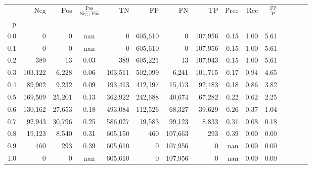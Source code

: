 \begin{tabular}{rrrcrrrrrrrrrrr}
\toprule
{} &      Neg &     Pos & $\frac{\text{Pos}}{\text{Neg}+\text{Pos}}$ &       TN &       FP &       FN &       TP &  Prec &   Rec & $\frac{\text{FP}}{\text{P}}$ \\
p   &          &         &                                            &          &          &          &          &       &       &                              \\
\midrule
0.0 &        0 &       0 &                                        nan &        0 &  605,610 &        0 &  107,956 &  0.15 &  1.00 &                         5.61 \\
0.1 &        0 &       0 &                                        nan &        0 &  605,610 &        0 &  107,956 &  0.15 &  1.00 &                         5.61 \\
0.2 &      389 &      13 &                                       0.03 &      389 &  605,221 &       13 &  107,943 &  0.15 &  1.00 &                         5.61 \\
0.3 &  103,122 &   6,228 &                                       0.06 &  103,511 &  502,099 &    6,241 &  101,715 &  0.17 &  0.94 &                         4.65 \\
0.4 &   89,902 &   9,232 &                                       0.09 &  193,413 &  412,197 &   15,473 &   92,483 &  0.18 &  0.86 &                         3.82 \\
0.5 &  169,509 &  25,201 &                                       0.13 &  362,922 &  242,688 &   40,674 &   67,282 &  0.22 &  0.62 &                         2.25 \\
0.6 &  130,162 &  27,653 &                                       0.18 &  493,084 &  112,526 &   68,327 &   39,629 &  0.26 &  0.37 &                         1.04 \\
0.7 &   92,943 &  30,796 &                                       0.25 &  586,027 &   19,583 &   99,123 &    8,833 &  0.31 &  0.08 &                         0.18 \\
0.8 &   19,123 &   8,540 &                                       0.31 &  605,150 &      460 &  107,663 &      293 &  0.39 &  0.00 &                         0.00 \\
0.9 &      460 &     293 &                                       0.39 &  605,610 &        0 &  107,956 &        0 &   nan &  0.00 &                         0.00 \\
1.0 &        0 &       0 &                                        nan &  605,610 &        0 &  107,956 &        0 &   nan &  0.00 &                         0.00 \\
\bottomrule
\end{tabular}
